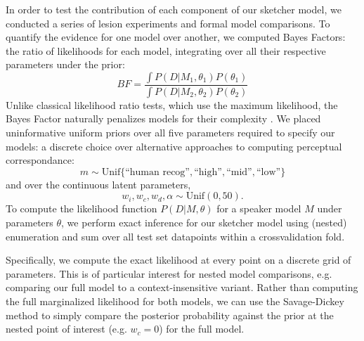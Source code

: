 \documentclass[9pt,twocolumn,twoside]{pnas-new}
\begin{document}
{In order to test the contribution of each component of our sketcher model, we conducted a series of lesion experiments and formal model comparisons.
To quantify the evidence for one model over another, we computed Bayes Factors:
the ratio of likelihoods for each model, integrating over all their respective parameters under the prior:
$$BF = \frac{\int P(D | M_1, \theta_1)P(\theta_1)}{\int P(D | M_2, \theta_2)P(\theta_2)}$$
Unlike classical likelihood ratio tests, which use the maximum likelihood, the Bayes Factor naturally penalizes models for their complexity \cite{wagenmakers2018bayesian,jefferys1992ockham}.
We placed uninformative uniform priors over all five parameters required to specify our models: a discrete choice over alternative approaches to computing perceptual correspondance: 
$$m \sim \textrm{Unif}\{\textrm{``human recog''}, \textrm{``high''}, \textrm{``mid''}, \textrm{``low''}\}$$
and over the continuous latent parameters, 
$$w_i, w_c, w_d, \alpha \sim \textrm{Unif}(0, 50).$$ 
To compute the likelihood function $P(D | M, \theta)$ for a speaker model $M$ under parameters $\theta$, we perform exact inference for our sketcher model using (nested) enumeration and sum over all test set datapoints within a crossvalidation fold. 



Specifically, we compute the exact likelihood at every point on a discrete grid of parameters.
This is of particular interest for nested model comparisons, e.g. comparing our full model to a context-insensitive variant.
Rather than computing the full marginalized likelihood for both models, we can use the Savage-Dickey method \cite{wagenmakers2010bayesian} to simply compare the posterior probability against the prior at the nested point of interest (e.g. $w_c = 0$) for the full model.

}
\end{document}
